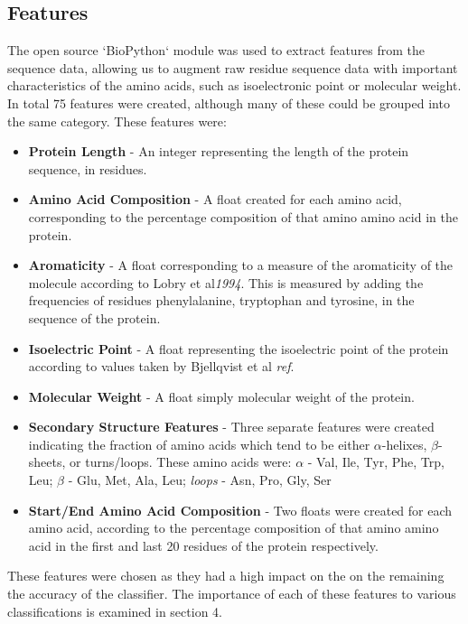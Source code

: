 \documentclass{bioinfo}
\begin{document}
\subsection{Features}

The open source `BioPython` module was used to extract features from the sequence data, allowing us to augment raw residue sequence data with important characteristics of the amino acids, such as isoelectronic point or molecular weight. 
In total 75 features were created, although many of these could be grouped into the same category. These features were:

\begin{itemize}


\item{ \textbf{Protein Length} } - An integer representing the length of the protein sequence, in residues.
\item{ \textbf{Amino Acid Composition} } - A float created for each amino acid, corresponding to the percentage composition of that amino amino acid in the protein.
\item{ \textbf{Aromaticity}} - A float corresponding to a measure of the aromaticity of the molecule according to Lobry et al\textit{1994}. This is measured by adding the frequencies of residues phenylalanine, tryptophan and tyrosine, in the sequence of the protein.
\item{ \textbf{Isoelectric Point}} - A float representing the isoelectric point of the protein according to values taken by Bjellqvist et al \textit{ref}.
\item{ \textbf{Molecular Weight}} - A float simply molecular weight of the protein. 
\item{ \textbf{Secondary Structure Features}} - Three separate features were created indicating the fraction of amino acids which tend to be either $\alpha$-helixes, $\beta$-sheets, or turns/loops. These amino acids were: $\alpha$ - Val, Ile, Tyr, Phe, Trp, Leu;   $\beta$ - Glu, Met, Ala, Leu; \textit{loops} -  Asn, Pro, Gly, Ser
\item{ \textbf{Start/End Amino Acid Composition} - Two floats were created for each amino acid, according to the percentage composition of that amino amino acid in the first and last 20 residues of the protein respectively.}

\end{itemize}

These features were chosen as they had a high impact on the on the remaining the accuracy of the classifier. 
The importance of each of these features to various classifications is examined in section 4.  
\end{document}
